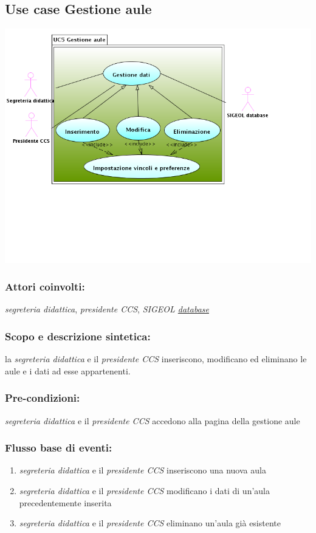 \documentclass[11pt,a4paper]{article}
\begin{document}
\subsection{Use case Gestione aule}
\includegraphics[scale=0.5]{images/UseCaseGestioneAule.png}
\subsubsection*{Attori coinvolti:}
\textit{segreteria didattica}, \textit{presidente CCS}, \textit{SIGEOL \underline{database}}
\subsubsection*{Scopo e descrizione sintetica:}
la \textit{segreteria didattica} e il \textit{presidente CCS} inseriscono, modificano ed eliminano le aule e i dati ad esse appartenenti.
\subsubsection*{Pre-condizioni:}
\textit{segreteria didattica} e il \textit{presidente CCS} accedono alla pagina della gestione aule
\subsubsection*{Flusso base di eventi:}
\begin{enumerate}
 \item \textit{segreteria didattica} e il \textit{presidente CCS} inseriscono una nuova aula
 \item \textit{segreteria didattica} e il \textit{presidente CCS} modificano i dati di un'aula precedentemente inserita
 \item \textit{segreteria didattica} e il \textit{presidente CCS} eliminano un'aula già esistente
\end{enumerate}
\end{document}
